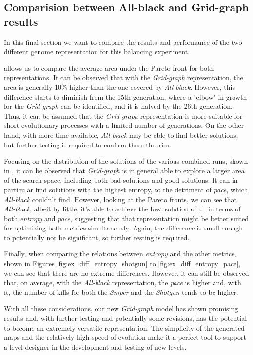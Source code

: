 \subsection{Comparision between All-black and Grid-graph results}
In this final section we want to compare the results and performance of the two different genome representation for this balancing experiment.

 allows us to compare the average area under the Pareto front for both representations. It can be observed that with the \textit{Grid-graph} representation, the area is generally 10\% higher than the one covered by \textit{All-black}. However, this difference starts to diminish from the 15th generation, where a "elbow" in growth for the \textit{Grid-graph} can be identified, and it is halved by the 26th generation. Thus, it can be assumed that the \textit{Grid-graph} representation is more suitable for short evolutionary processes with a limited number of generations. On the other hand, with more time available, \textit{All-black} may be able to find better solutions, but further testing is required to confirm these theories.

Focusing on the distribution of the solutions of the various combined runs, shown in , it can be observed that \textit{Grid-graph} is in general able to explore a larger area of the search space, including both bad solutions and good solutions. It can in particular find solutions with the highest entropy, to the detriment of \textit{pace}, which \textit{All-black} couldn't find.  However, looking at the Pareto fronts, we can see that \textit{All-black}, albeit by little, it's able to achieve the best solution of all in terms of both \textit{entropy} and \textit{pace}, suggesting that that representation might be better suited for optimizing both metrics simultanously. Again, the difference is small enough to potentially not be significant, so further testing is required.

Finally, when comparing the relations between \textit{entropy} and the other metrics, shown in Figures \ref{fig:ex_diff_entropy_shotgun} to \ref{fig:ex_diff_entropy_pace}, we can see that there are no extreme differences. However, it can still be observed that, on average, with the \textit{All-black} representation, the \textit{pace} is higher and, with it, the number of kills for both the \textit{Sniper} and the \textit{Shotgun} tends to be higher.

With all these considerations, our new \textit{Grid-graph} model has shown promising results and, with further testing and potentially some revisions, has the potential to become an extremely versatile representation. The simplicity of the generated maps and the relatively high speed of evolution make it a perfect tool to support a level designer in the development and testing of new levels.

